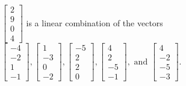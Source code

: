 \begin{exercise}
\begin{exerciseStatement}
  \end{exerciseStatement}
  \begin{exerciseAnswer}
   \(\left[\begin{array}{c}
2 \\
9 \\
0 \\
4
\end{array}\right]\) 
  	 is  
	a linear combination of the vectors \(\left[\begin{array}{c}
-4 \\
-2 \\
1 \\
-1
\end{array}\right] , \left[\begin{array}{c}
1 \\
-3 \\
0 \\
-2
\end{array}\right] , \left[\begin{array}{c}
-5 \\
2 \\
2 \\
0
\end{array}\right] , \left[\begin{array}{c}
4 \\
2 \\
-5 \\
-1
\end{array}\right] , \text{ and } \left[\begin{array}{c}
4 \\
-2 \\
-5 \\
-3
\end{array}\right]\).

	
  


  \end{exerciseAnswer}
\end{exercise}